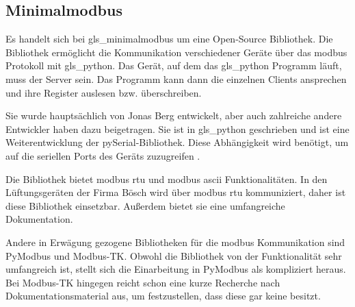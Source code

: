 \subsection{Minimalmodbus} \label{minimalmodbus}
Es handelt sich bei \gls{gls_minimalmodbus} um eine Open-Source Bibliothek. Die Bibliothek ermöglicht die Kommunikation verschiedener Geräte über das \gls{modbus} Protokoll mit \gls{gls_python}. Das Gerät, auf dem das \gls{gls_python} Programm läuft, muss der Server sein. Das Programm kann dann die einzelnen Clients ansprechen und ihre Register auslesen bzw. überschreiben.

Sie wurde hauptsächlich von Jonas Berg entwickelt, aber auch zahlreiche andere Entwickler haben dazu beigetragen. Sie ist in \gls{gls_python} geschrieben und ist eine Weiterentwicklung der pySerial-Bibliothek. Diese Abhängigkeit wird benötigt, um auf die seriellen Ports des Geräts zuzugreifen \cite{Liechti_pySerial:o.J.}. 

Die Bibliothek bietet \gls{modbus} \acs{rtu} und \gls{modbus} \acs{ascii} Funktionalitäten. In den Lüftungsgeräten der Firma Bösch wird über \gls{modbus} \acs{rtu} kommuniziert, daher ist diese Bibliothek einsetzbar. Außerdem bietet sie eine umfangreiche Dokumentation.
\cite{Berg_MiniModbus:2023, Berg_MiniModbus_Git:2023} 

Andere in Erwägung gezogene Bibliotheken für die \gls{modbus} Kommunikation sind PyModbus und Modbus-TK. Obwohl die Bibliothek von der Funktionalität sehr umfangreich ist, stellt sich die Einarbeitung in PyModbus als kompliziert heraus. Bei Modbus-TK hingegen reicht schon eine kurze Recherche nach Dokumentationsmaterial aus, um festzustellen, dass diese gar keine besitzt.